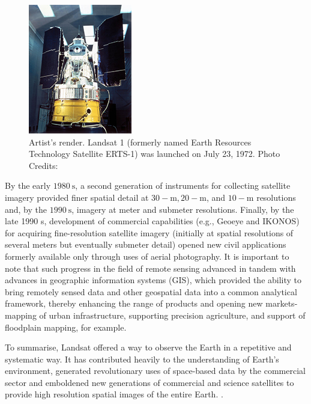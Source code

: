 \begin{figure}[H]
\centering
\includegraphics[totalheight=0.2\textheight]{Landsat1.jpg}
\caption{Artist's render. Landsat 1 (formerly named Earth Resources Technology Satellite ERTS-1) was launched on July 23, 1972. Photo Credits: \cite{landsat1}
}
\end{figure}


By the early $1980\mathrm{~s}$, a second generation of instruments for collecting satellite imagery provided finer spatial detail at $30-\mathrm{m}, 20-\mathrm{m}$, and $10-\mathrm{m}$ resolutions and, by the $1990 \mathrm{~s}$, imagery at meter and submeter resolutions. Finally, by the late 1990 s, development of commercial capabilities (e.g., Geoeye and IKONOS) for acquiring fine-resolution satellite imagery (initially at spatial resolutions of several meters but eventually submeter detail) opened new civil applications formerly available only through uses of aerial photography. It is important to note that such progress in the field of remote sensing advanced in tandem with advances in geographic information systems (GIS), which provided the ability to bring remotely sensed data and other geospatial data into a common analytical framework, thereby enhancing the range of products and opening new markets-mapping of urban infrastructure, supporting precision agriculture, and support of floodplain mapping, for example.


\par



To summarise, Landsat offered a way to observe the Earth in a repetitive and systematic way. It has contributed heavily to the understanding of Earth's environment, generated revolutionary uses of space-based data by the commercial sector and emboldened new generations of commercial and science satellites to provide high resolution spatial images of the entire Earth. \cite{campbell2011introduction, Williams:2006:0099-1112:1171}.

